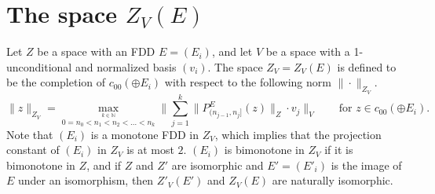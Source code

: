 \documentclass[11pt,leqno]{amsart}
\theoremstyle{definition}
\newcommand{\N}{\mathbb{N}}
\begin{document}
\section{The space $Z_V(E)$}\label{S:2}

Let $Z$ be a space with an FDD $E=(E_i)$, and let $V$ be a space with a
1-unconditional and normalized
basis $(v_i)$. The space $Z_V=Z_V(E)$ is defined to be the completion
of $c_{00}(\oplus E_i)$ with respect to the following norm $\|\cdot\|_{Z_V}$.
$$\|z\|_{Z_V}
=\max_{\stackrel{k\in\N}{0=n_0<n_1<n_2<\ldots<n_k}}
\Big\|\sum_{j=1}^k\|P^E_{(n_{j-1},n_j]}(z)\|_Z\cdot
  v_j\Big\|_V\qquad\text{for }z\in  c_{00}(\oplus E_i).$$
Note that $(E_i)$ is a monotone FDD in $Z_V$, which implies that
the projection constant of $(E_i)$ in $Z_V$ is at most $2$.
$(E_i)$ is bimonotone in $Z_V$ if it is bimonotone  in $Z$, and if
$Z$ and $Z'$ are isomorphic
and $E'=(E'_i)$ is the image of $E$ under
an isomorphism,
then $Z'_V(E')$ and $Z_V(E)$ are naturally isomorphic.
\end{document}
